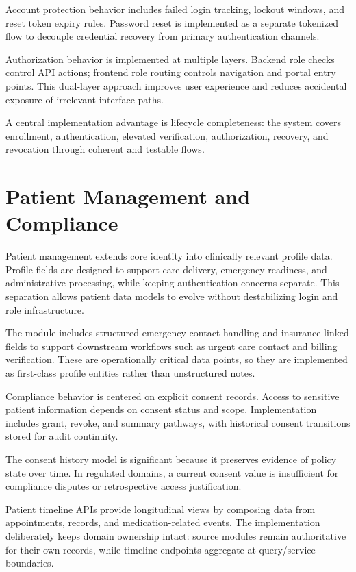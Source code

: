 Account protection behavior includes failed login tracking, lockout windows, and reset token expiry rules. Password reset is implemented as a separate tokenized flow to decouple credential recovery from primary authentication channels.

Authorization behavior is implemented at multiple layers. Backend role checks control API actions; frontend role routing controls navigation and portal entry points. This dual-layer approach improves user experience and reduces accidental exposure of irrelevant interface paths.

A central implementation advantage is lifecycle completeness: the system covers enrollment, authentication, elevated verification, authorization, recovery, and revocation through coherent and testable flows.

\section{Patient Management and Compliance}\label{55-patient-management-and-compliance}

Patient management extends core identity into clinically relevant profile data. Profile fields are designed to support care delivery, emergency readiness, and administrative processing, while keeping authentication concerns separate. This separation allows patient data models to evolve without destabilizing login and role infrastructure.

The module includes structured emergency contact handling and insurance-linked fields to support downstream workflows such as urgent care contact and billing verification. These are operationally critical data points, so they are implemented as first-class profile entities rather than unstructured notes.

Compliance behavior is centered on explicit consent records. Access to sensitive patient information depends on consent status and scope. Implementation includes grant, revoke, and summary pathways, with historical consent transitions stored for audit continuity.

The consent history model is significant because it preserves evidence of policy state over time. In regulated domains, a current consent value is insufficient for compliance disputes or retrospective access justification.

Patient timeline APIs provide longitudinal views by composing data from appointments, records, and medication-related events. The implementation deliberately keeps domain ownership intact: source modules remain authoritative for their own records, while timeline endpoints aggregate at query/service boundaries.

